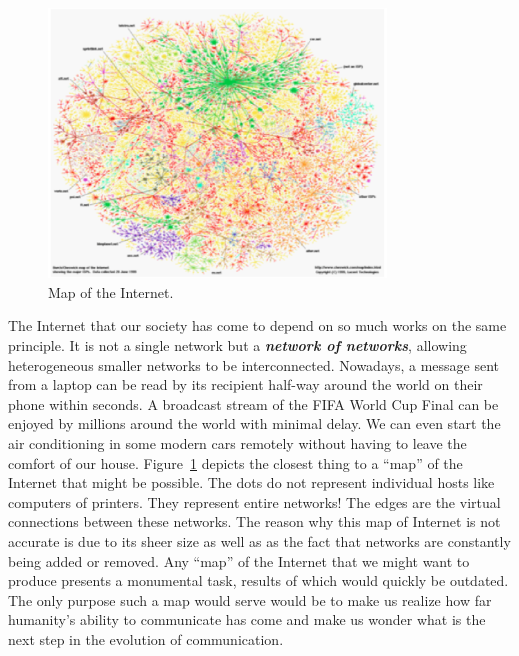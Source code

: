 \begin{figure}[h]
    \centering
    \includegraphics[width=0.8\textwidth]{lesson1/internetmap.eps}
    \caption[Map of the Internet.]{Map of the Internet.}
    \label{fig:1-1_internet}
\end{figure}

The Internet that our society has come to depend on so much works on the same principle.
It is not a single network but a \textit{\textbf{network of networks}}, allowing heterogeneous smaller networks to be interconnected.
Nowadays, a message sent from a laptop can be read by its recipient half-way around the world on their phone within seconds.
A broadcast stream of the FIFA World Cup Final can be enjoyed by millions around the world with minimal delay.
We can even start the air conditioning in some modern cars remotely without having to leave the comfort of our house.
Figure~\ref{fig:1-1_internet} depicts the closest thing to a ``map'' of the Internet that might be possible.
The dots do not represent individual hosts like computers of printers.
They represent entire networks!
The edges are the virtual connections between these networks.
The reason why this map of Internet is not accurate is due to its sheer size as well as as the fact that networks are constantly being added or removed.
Any ``map'' of the Internet that we might want to produce presents a monumental task, results of which would quickly be outdated.
The only purpose such a map would serve would be to make us realize how far humanity's ability to communicate has come and make us wonder what is the next step in the evolution of communication.


